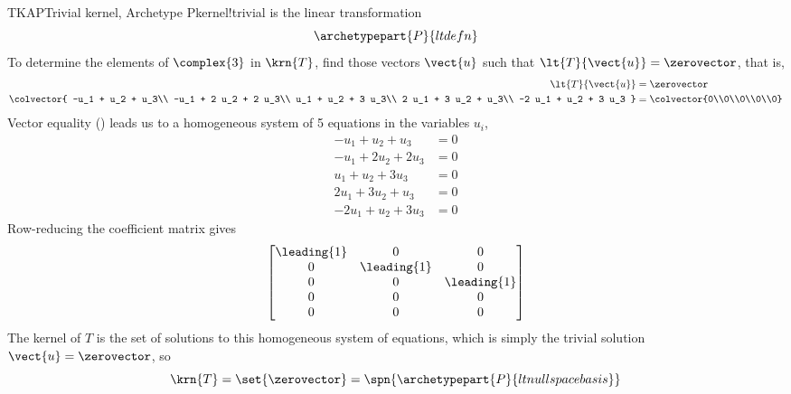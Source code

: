 \begin{example}{TKAP}{Trivial kernel, Archetype P}{kernel!trivial}
 is the linear transformation
%
\begin{equation*}
\archetypepart{P}{ltdefn}
\end{equation*}
%
To determine the elements of $\complex{3}$ in $\krn{T}$, find those vectors $\vect{u}$ such that $\lt{T}{\vect{u}}=\zerovector$, that is,
%
\begin{align*}
\lt{T}{\vect{u}}&=\zerovector\\
\colvector{
-u_1 + u_2 + u_3\\
-u_1 + 2 u_2 + 2 u_3\\
u_1 + u_2 + 3 u_3\\
2 u_1 + 3 u_2 + u_3\\
-2 u_1 + u_2 + 3 u_3
}
&=
\colvector{0\\0\\0\\0\\0}
%
\end{align*}
%
Vector equality () leads us to a homogeneous system of 5 equations in the variables $u_i$,
%
\begin{align*}
-u_1 + u_2 + u_3&=0\\
-u_1 + 2 u_2 + 2 u_3&=0\\
u_1 + u_2 + 3 u_3&=0\\
2 u_1 + 3 u_2 + u_3&=0\\
-2 u_1 + u_2 + 3 u_3&=0
\end{align*}
%
Row-reducing the coefficient matrix gives
%
\begin{equation*}
\begin{bmatrix}
\leading{1} & 0 & 0\\
0 & \leading{1} & 0\\
0 & 0 & \leading{1}\\
0 & 0 & 0\\
0 & 0 & 0
\end{bmatrix}
\end{equation*}
%
The kernel of $T$ is the set of solutions to this homogeneous system of equations, which is simply the trivial solution $\vect{u}=\zerovector$, so
%
\begin{equation*}
\krn{T}=\set{\zerovector}=\spn{\archetypepart{P}{ltnullspacebasis}}
\end{equation*}
%
\end{example}
%
%

